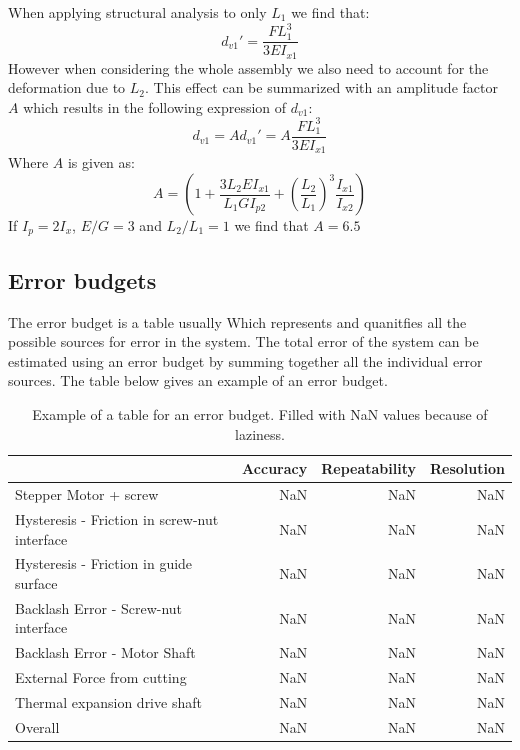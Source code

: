 \documentclass[11pt, a4paper]{article}
\numberwithin{equation}{section}
\numberwithin{figure}{section}
\begin{document}
When applying structural analysis to only $L_1$ we find that:
\begin{equation}
  d_{v1}' = \frac{FL_1^3}{3EI_{x1}}
\end{equation}
However when considering the whole assembly we also need to account for the deformation due to $L_2$. This effect can be summarized with an amplitude factor $A$ which results in the following expression of $d_{v1}$:
\begin{equation}
  d_{v1} = Ad_{v1}' = A\frac{FL_1^3}{3EI_{x1}}
\end{equation}
Where $A$ is given as:
\begin{equation}
  A = \left( 1 + \frac{3L_2 E I_{x1}}{L_1GI_{p2}} + \left( \frac{L_2}{L_1}\right)^3 \frac{I_{x1}}{I_{x2}}\right)
\end{equation}
If $I_p = 2I_x$, $E/G=3$ and $L_2/L_1 = 1$ we find that $A=6.5$


\subsection{Error budgets}
The error budget is a table usually Which represents and quanitfies all the possible sources for error in the system. The total error of the system can be estimated using an error budget by summing together all the individual error sources. The table below gives an example of an error budget.
\begin{table}[h]
  \caption{Example of a table for an error budget. Filled with NaN values because of laziness.} %
  \centering %
  \begin{tabular}{l|rrr} %
    \hline\hline %
    & Accuracy & Repeatability & Resolution \\ [0.5ex] %
    \hline %
    Stepper Motor + screw                        & NaN & NaN & NaN\\ 
    Hysteresis - Friction in screw-nut interface & NaN & NaN & NaN\\
    Hysteresis - Friction in guide surface       & NaN & NaN & NaN\\
    Backlash Error - Screw-nut interface         & NaN & NaN & NaN\\
    Backlash Error - Motor Shaft                 & NaN & NaN & NaN\\
    External Force from cutting                  & NaN & NaN & NaN\\
    Thermal expansion drive shaft                & NaN & NaN & NaN\\
    \hline
    Overall                                      & NaN & NaN & NaN\\
  \hline %
  \end{tabular}
  \label{tab:hresult}
\end{table}
\end{document}
